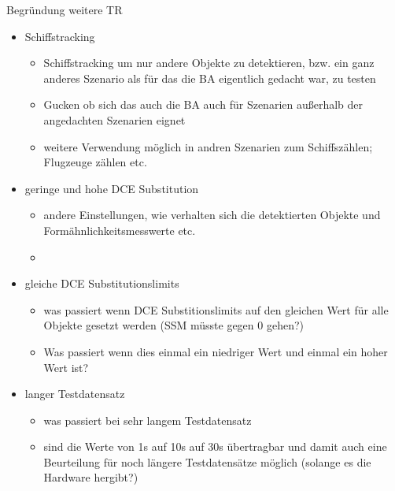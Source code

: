 {Begründung weitere TR
\begin{itemize}
	\item Schiffstracking
	\begin{itemize}
		\item Schiffstracking um nur andere Objekte zu detektieren, bzw. ein ganz anderes Szenario als für das die BA eigentlich gedacht war, zu testen
		\item Gucken ob sich das auch die BA auch für Szenarien außerhalb der angedachten Szenarien eignet 
		\item weitere Verwendung möglich in andren Szenarien zum Schiffszählen; Flugzeuge zählen etc.
	\end{itemize}
	\item geringe und hohe DCE Substitution
	\begin{itemize}
		\item andere Einstellungen, wie verhalten sich die detektierten Objekte und Formähnlichkeitsmesswerte etc.
		\item 
	\end{itemize}
	\item gleiche DCE Substitutionslimits
	\begin{itemize}
		\item was passiert wenn DCE Substitionslimits auf den gleichen Wert für alle Objekte gesetzt werden (SSM müsste gegen 0 gehen?)
		\item Was passiert wenn dies einmal ein niedriger Wert und einmal ein hoher Wert ist?
	\end{itemize}
	\item langer Testdatensatz
	\begin{itemize}
		\item was passiert bei sehr langem Testdatensatz
		\item sind die Werte von 1s auf 10s auf 30s übertragbar und damit auch eine Beurteilung für noch längere Testdatensätze möglich (solange es die Hardware hergibt?)
	\end{itemize}
\end{itemize}

}




